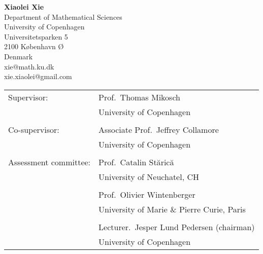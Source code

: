 


\usepackage[numbers,sort&compress]{natbib}
\usepackage{algorithm}
\usepackage{algpseudocode}
\usepackage{appendix}
\graphicspath{
        {../papers/FX/}{../papers/Jeffrey1/}
        {../papers/Anja/}
        {../papers/DavisMikoschHeinyXie/}
}







\frontmatter


\newpage
\leavevmode\thispagestyle{empty} 

\hspace*{0.5cm}  {\bf Xiaolei Xie}\\
\hspace*{1.5cm} Department of Mathematical Sciences\\
\hspace*{1.5cm} University of Copenhagen\\
\hspace*{1.5cm} Universitetsparken 5\\
\hspace*{1.5cm} 2100 København Ø\\
\hspace*{1.5cm} Denmark\\
\hspace*{1.5cm} xie@math.ku.dk\\
\hspace*{1.5cm} xie.xiaolei@gmail.com

\vspace*{3cm}

\begin{tabular}{ll}
Supervisor: & Prof.~Thomas Mikosch\\
& University of Copenhagen\\
& \\
Co-supervisor: & Associate Prof.~Jeffrey Collamore\\
& University of Copenhagen\\
& \\
Assessment committee: &  Prof.~Catalin St{\u{a}}ric{\u{a}}\\
& University of Neuchatel, CH\\
& \\

& Prof.~Olivier Wintenberger\\
& University of Marie \& Pierre Curie, Paris\\
& \\

& Lecturer.~Jesper Lund Pedersen (chairman)\\
& University of Copenhagen\\
\end{tabular}

